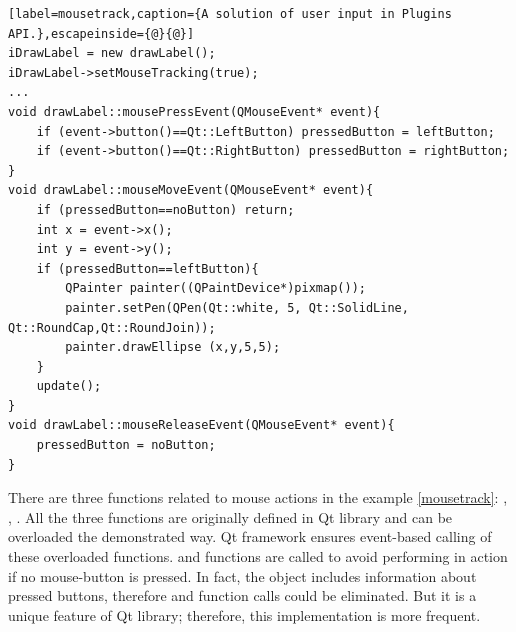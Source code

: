 \begin{lstlisting}[label=mousetrack,caption={A solution of user input in Plugins API.},escapeinside={@}{@}]
iDrawLabel = new drawLabel();
iDrawLabel->setMouseTracking(true);
...
void drawLabel::mousePressEvent(QMouseEvent* event){
	if (event->button()==Qt::LeftButton) pressedButton = leftButton;
	if (event->button()==Qt::RightButton) pressedButton = rightButton;
}
void drawLabel::mouseMoveEvent(QMouseEvent* event){
	if (pressedButton==noButton) return;
	int x = event->x();
	int y = event->y();
	if (pressedButton==leftButton){
		QPainter painter((QPaintDevice*)pixmap());
		painter.setPen(QPen(Qt::white, 5, Qt::SolidLine, Qt::RoundCap,Qt::RoundJoin));
		painter.drawEllipse (x,y,5,5);
	}
	update();
}
void drawLabel::mouseReleaseEvent(QMouseEvent* event){
	pressedButton = noButton;
}
\end{lstlisting}

There are three functions related to mouse actions in the example \ref{mousetrack}: , , . All the three functions are originally defined in Qt library and can be overloaded the demonstrated way. Qt framework ensures event-based calling of these overloaded functions.  and  functions are called to avoid performing in  action if no mouse-button is pressed. In fact, the  object includes information about pressed buttons, therefore  and  function calls could be eliminated. But it is a unique feature of Qt library; therefore, this implementation is more frequent.